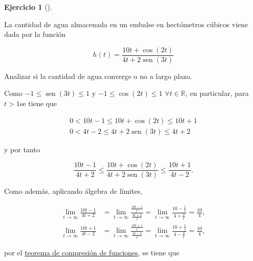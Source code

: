 \documentclass[
  spanish,
  a4paper,
]{scrreport}
\theoremstyle{definition}
\newtheorem{exercise}{Ejercicio}[chapter]
\theoremstyle{remark}
\begin{document}
\begin{exercise}[]\protect\hypertarget{exr-2}{}\label{exr-2}

La cantidad de agua almacenada en un embalse en hectómetros cúbicos
viene dada por la función

\[
h(t) = \frac{10t+\cos(2t)}{4t+2\operatorname{sen}(3t)}
\]

Analizar si la cantidad de agua converge o no a largo plazo.

\end{exercise}

\begin{tcolorbox}[enhanced jigsaw, arc=.35mm, bottomrule=.15mm, bottomtitle=1mm, breakable, colback=white, colbacktitle=quarto-callout-tip-color!10!white, colframe=quarto-callout-tip-color-frame, coltitle=black, left=2mm, leftrule=.75mm, opacityback=0, opacitybacktitle=0.6, rightrule=.15mm, title=\textcolor{quarto-callout-tip-color}{\faLightbulb}\hspace{0.5em}{Solución}, titlerule=0mm, toprule=.15mm, toptitle=1mm]

Como \(-1\leq \operatorname{sen}(3t)\leq 1\) y \(-1\leq \cos(2t)\leq 1\)
\(\forall t\in\mathbb{R}\), en particular, para \(t>1\)se tiene que

\[
\begin{gathered}
0 < 10t-1 \leq 10t+\cos(2t) \leq 10t+1 \\
0 < 4t-2 \leq 4t+2\operatorname{sen}(3t) \leq 4t+2
\end{gathered}
\]

y por tanto

\[
\frac{10t-1}{4t+2} \leq \frac{10t+\cos(2t)}{4t+2\operatorname{sen}(3t)} \leq \frac{10t+1}{4t-2}.
\]

Como además, aplicando álgebra de límites,

\begin{align*}
\lim_{t\to\infty} \frac{10t-1}{4t+2} 
&= \lim_{t\to\infty} \frac{\frac{10t-1}{t}}{\frac{4t+2}{t}}
= \lim_{t\to\infty} \frac{10-\frac{1}{t}}{4+\frac{2}{t}}
= \frac{10}{4}, \\
\lim_{t\to\infty} \frac{10t+1}{4t-2} 
&= \lim_{t\to\infty} \frac{\frac{10t+1}{t}}{\frac{4t-2}{t}}
= \lim_{t\to\infty} \frac{10+\frac{1}{t}}{4-\frac{2}{t}}
= \frac{10}{4},
\end{align*}

por el
\href{https://aprendeconalf.es/analisis-manual/06-limites.html\#thm-compresi\%C3\%B3n-funciones}{teorema
de compresión de funciones}, se tiene que


\end{tcolorbox}
\end{document}
